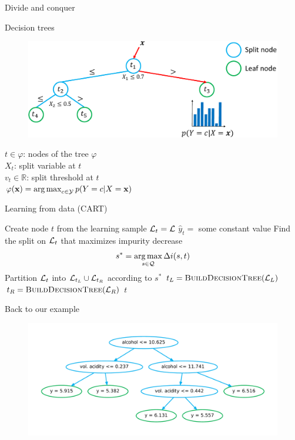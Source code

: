 \documentclass{beamer}
\DeclareMathOperator*{\argmax}{arg\,max}
\begin{document}
\begin{frame}{Divide and conquer}
\begin{figure}
\end{figure}
\end{frame}

\begin{frame}{Decision trees}
\begin{figure}
\includegraphics[scale=0.5]{./figures/tree-simple.pdf}
\end{figure}

$t \in \varphi$: nodes of the tree $\varphi$\\
$X_t$: split variable at $t$ \\
$v_t \in \mathbb{R}$: split threshold at $t$\\
$\varphi(\mathbf{x}) = \argmax_{c \in {\cal Y}} p(Y = c | X = \mathbf{x})$
\end{frame}

\begin{frame}[fragile]{Learning from data {\scriptsize (CART)}}

\begin{algorithmic}
    \State Create node $t$ from the learning sample ${\cal L}_t = {\cal L}$
        \State $\widehat{y}_{t} =$ some constant value
    \Else
        \State Find the split on ${\cal L}_t$ that maximizes impurity decrease $$s^* = \argmax_{s \in {\cal Q}} \Delta i(s, t)$$
        \State Partition ${\cal L}_t$ into ${\cal L}_{t_L} \cup {\cal L}_{t_R}$ according to $s^*$
        \State $t_L = \Call{BuildDecisionTree}{{\cal L}_{L}}$
        \State $t_R = \Call{BuildDecisionTree}{{\cal L}_{R}}$
    \EndIf
    \State \Return $t$
\EndFunction
\end{algorithmic}

\end{frame}

\begin{frame}{Back to our example}
\begin{figure}
\includegraphics[scale=0.4]{./figures/tree-wine.pdf}
\end{figure}
\end{frame}
\end{document}
